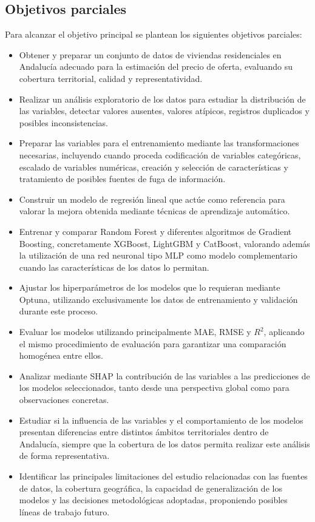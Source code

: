 \documentclass[IB]{TFUOC}%
\begin{document}
\subsection{Objetivos parciales}

Para alcanzar el objetivo principal se plantean los siguientes objetivos parciales:

\begin{itemize}
\item Obtener y preparar un conjunto de datos de viviendas residenciales en Andalucía adecuado para la estimación del precio de oferta, evaluando su cobertura territorial, calidad y representatividad.
\item Realizar un análisis exploratorio de los datos para estudiar la distribución de las variables, detectar valores ausentes, valores atípicos, registros duplicados y posibles inconsistencias.
\item Preparar las variables para el entrenamiento mediante las transformaciones necesarias, incluyendo cuando proceda codificación de variables categóricas, escalado de variables numéricas, creación y selección de características y tratamiento de posibles fuentes de fuga de información.
\item Construir un modelo de regresión lineal que actúe como referencia para valorar la mejora obtenida mediante técnicas de aprendizaje automático.
\item Entrenar y comparar Random Forest y diferentes algoritmos de Gradient Boosting, concretamente XGBoost, LightGBM y CatBoost, valorando además la utilización de una red neuronal tipo MLP como modelo complementario cuando las características de los datos lo permitan.
\item Ajustar los hiperparámetros de los modelos que lo requieran mediante Optuna, utilizando exclusivamente los datos de entrenamiento y validación durante este proceso.
\item Evaluar los modelos utilizando principalmente MAE, RMSE y $R^2$, aplicando el mismo procedimiento de evaluación para garantizar una comparación homogénea entre ellos.
\item Analizar mediante SHAP la contribución de las variables a las predicciones de los modelos seleccionados, tanto desde una perspectiva global como para observaciones concretas.
\item Estudiar si la influencia de las variables y el comportamiento de los modelos presentan diferencias entre distintos ámbitos territoriales dentro de Andalucía, siempre que la cobertura de los datos permita realizar este análisis de forma representativa.
\item Identificar las principales limitaciones del estudio relacionadas con las fuentes de datos, la cobertura geográfica, la capacidad de generalización de los modelos y las decisiones metodológicas adoptadas, proponiendo posibles líneas de trabajo futuro.
\end{itemize}
\end{document}
